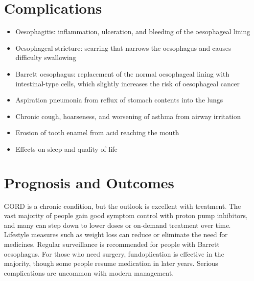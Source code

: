 \section*{Complications}
\begin{itemize}
    \item Oesophagitis: inflammation, ulceration, and bleeding of the oesophageal lining
    \item Oesophageal stricture: scarring that narrows the oesophagus and causes difficulty swallowing
    \item Barrett oesophagus: replacement of the normal oesophageal lining with intestinal-type cells, which slightly increases the risk of oesophageal cancer
    \item Aspiration pneumonia from reflux of stomach contents into the lungs
    \item Chronic cough, hoarseness, and worsening of asthma from airway irritation
    \item Erosion of tooth enamel from acid reaching the mouth
    \item Effects on sleep and quality of life
\end{itemize}

\section*{Prognosis and Outcomes}
GORD is a chronic condition, but the outlook is excellent with treatment. The vast majority of people gain good symptom control with proton pump inhibitors, and many can step down to lower doses or on-demand treatment over time. Lifestyle measures such as weight loss can reduce or eliminate the need for medicines. Regular surveillance is recommended for people with Barrett oesophagus. For those who need surgery, fundoplication is effective in the majority, though some people resume medication in later years. Serious complications are uncommon with modern management.

